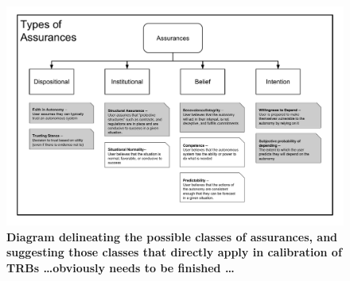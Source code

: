         \begin{figure}
            \includegraphics[width=8in]{Figures/Assurances.pdf}%
            \caption{\textbf{Diagram delineating the possible classes of assurances, and suggesting those classes that directly apply in calibration of TRBs \ldots obviously needs to be finished \ldots}}
            \label{fig:Assurance_classes}
        \end{figure}
